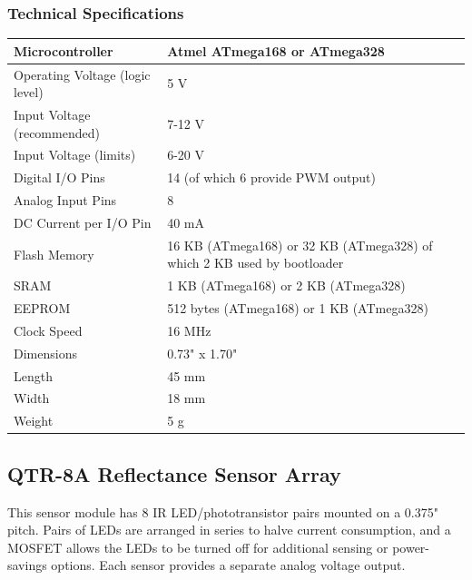\documentclass[14pt,a4paper]{extarticle}
\begin{document}
	

	\subsubsection{Technical Specifications}
	
	\begin{tabular}{| p{5cm} | p{12cm} |}

	\hline
	Microcontroller & Atmel ATmega168 or ATmega328 \\ \hline
	Operating Voltage (logic level) & 5 V \\ \hline
	Input Voltage (recommended) &	7-12 V \\ \hline
	Input Voltage (limits)	& 6-20 V \\ \hline
Digital I/O Pins &	14 (of which 6 provide PWM output)\\ \hline
Analog Input Pins &	8 \\ \hline
DC Current per I/O Pin & 40 mA \\ \hline
Flash Memory &	16 KB (ATmega168) or 32 KB (ATmega328) of which 2 KB used by bootloader \\ \hline
SRAM &	1 KB (ATmega168) or 2 KB (ATmega328)\\ \hline
EEPROM	& 512 bytes (ATmega168) or 1 KB (ATmega328)\\ \hline
Clock Speed &	16 MHz \\ \hline
Dimensions &	0.73" x 1.70" \\ \hline
Length &	45 mm\\ \hline
Width &	18 mm\\ \hline
Weight	& 5 g\\ \hline
	
	\end{tabular}

	
	\subsection{QTR-8A Reflectance Sensor Array}
	
	This sensor module has 8 IR LED/phototransistor pairs mounted on a 0.375" pitch. Pairs of LEDs are arranged in series to halve current consumption, and a MOSFET allows the LEDs to be turned off for additional sensing or power-savings options. Each sensor provides a separate analog voltage output.
	
\end{document}
